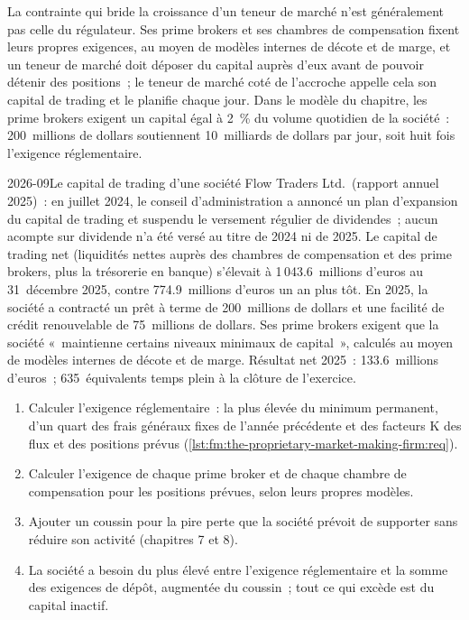 La contrainte qui bride la croissance d'un teneur de marché n'est généralement pas celle du régulateur. Ses prime brokers et ses chambres de compensation fixent leurs propres
exigences, au moyen de modèles internes de décote et de marge, et un teneur de marché doit déposer du capital auprès d'eux avant de pouvoir détenir des positions~; le
teneur de marché coté de l'accroche appelle cela son capital de trading et le planifie chaque jour. Dans le modèle du chapitre, les prime brokers exigent un capital égal à 2~\%
du volume quotidien de la société~: 200~millions de dollars soutiennent 10~milliards de dollars par jour, soit huit fois l'exigence réglementaire.

\begin{dated}{2026-09}{Le capital de trading d'une société}\label{dat:fm:the-proprietary-market-making-firm:flow}
Flow Traders Ltd.\ (rapport annuel 2025)~: en juillet 2024, le conseil d'administration a annoncé un plan d'expansion du capital de trading et suspendu le versement
régulier de dividendes~; aucun acompte sur dividende n'a été versé au titre de 2024 ni de 2025. Le capital de trading net (liquidités nettes auprès des chambres de compensation
et des prime brokers, plus la trésorerie en banque) s'élevait à 1\,043.6~millions d'euros au 31~décembre 2025, contre 774.9~millions d'euros un an plus tôt. En 2025, la société a
contracté un prêt à terme de 200~millions de dollars et une facilité de crédit renouvelable de 75~millions de dollars. Ses prime brokers exigent que la société
«~maintienne certains niveaux minimaux de capital~», calculés au moyen de modèles internes de décote et de marge. Résultat net 2025~: 133.6~millions d'euros~; 635~équivalents temps plein à la clôture de l'exercice.
\end{dated}

\begin{method}\label{met:fm:the-proprietary-market-making-firm:size}
\begin{enumerate}
\item Calculer l'exigence réglementaire~: la plus élevée du minimum permanent, d'un quart des frais généraux fixes de l'année précédente et des facteurs K
des flux et des positions prévus (\cref{lst:fm:the-proprietary-market-making-firm:req}).
\item Calculer l'exigence de chaque prime broker et de chaque chambre de compensation pour les positions prévues, selon leurs propres modèles.
\item Ajouter un coussin pour la pire perte que la société prévoit de supporter sans réduire son activité (chapitres 7 et 8).
\item La société a besoin du plus élevé entre l'exigence réglementaire et la somme des exigences de dépôt, augmentée du coussin~; tout ce qui excède est du capital inactif.
\end{enumerate}
\end{method}

